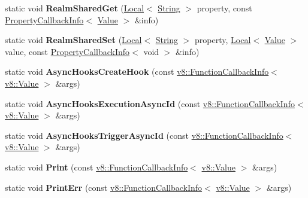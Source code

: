 \begin{DoxyCompactItemize}
static void {\bfseries Realm\+Shared\+Get} (\mbox{\hyperlink{classv8_1_1Local}{Local}}$<$ \mbox{\hyperlink{classv8_1_1String}{String}} $>$ property, const \mbox{\hyperlink{classv8_1_1PropertyCallbackInfo}{Property\+Callback\+Info}}$<$ \mbox{\hyperlink{classv8_1_1Value}{Value}} $>$ \&info)
\item 
\mbox{\label{classv8_1_1Shell_a88d66b6299a850963f0fc2226e19c157}} 
static void {\bfseries Realm\+Shared\+Set} (\mbox{\hyperlink{classv8_1_1Local}{Local}}$<$ \mbox{\hyperlink{classv8_1_1String}{String}} $>$ property, \mbox{\hyperlink{classv8_1_1Local}{Local}}$<$ \mbox{\hyperlink{classv8_1_1Value}{Value}} $>$ value, const \mbox{\hyperlink{classv8_1_1PropertyCallbackInfo}{Property\+Callback\+Info}}$<$ void $>$ \&info)
\item 
\mbox{\label{classv8_1_1Shell_ab9ac6e3de29fda7cbc2331ec8b91a718}} 
static void {\bfseries Async\+Hooks\+Create\+Hook} (const \mbox{\hyperlink{classv8_1_1FunctionCallbackInfo}{v8\+::\+Function\+Callback\+Info}}$<$ \mbox{\hyperlink{classv8_1_1Value}{v8\+::\+Value}} $>$ \&args)
\item 
\mbox{\label{classv8_1_1Shell_a28a1550a3c18501b79fd921ba4d19963}} 
static void {\bfseries Async\+Hooks\+Execution\+Async\+Id} (const \mbox{\hyperlink{classv8_1_1FunctionCallbackInfo}{v8\+::\+Function\+Callback\+Info}}$<$ \mbox{\hyperlink{classv8_1_1Value}{v8\+::\+Value}} $>$ \&args)
\item 
\mbox{\label{classv8_1_1Shell_ab22128c64873f672c07cf58db4608a67}} 
static void {\bfseries Async\+Hooks\+Trigger\+Async\+Id} (const \mbox{\hyperlink{classv8_1_1FunctionCallbackInfo}{v8\+::\+Function\+Callback\+Info}}$<$ \mbox{\hyperlink{classv8_1_1Value}{v8\+::\+Value}} $>$ \&args)
\item 
\mbox{\label{classv8_1_1Shell_a7b8bdce48fa4a1b5e9ce8df50fc0a655}} 
static void {\bfseries Print} (const \mbox{\hyperlink{classv8_1_1FunctionCallbackInfo}{v8\+::\+Function\+Callback\+Info}}$<$ \mbox{\hyperlink{classv8_1_1Value}{v8\+::\+Value}} $>$ \&args)
\item 
\mbox{\label{classv8_1_1Shell_a0557d6f0819b1f7eda96e6c09a5264f0}} 
static void {\bfseries Print\+Err} (const \mbox{\hyperlink{classv8_1_1FunctionCallbackInfo}{v8\+::\+Function\+Callback\+Info}}$<$ \mbox{\hyperlink{classv8_1_1Value}{v8\+::\+Value}} $>$ \&args)

\end{DoxyCompactItemize}
